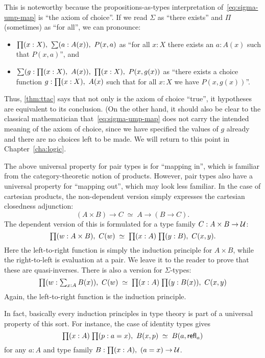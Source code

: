 This is noteworthy because the propositions-as-types interpretation of~\eqref{eq:sigma-ump-map} is ``the axiom of choice''.
If we read $\Sigma$ as ``there exists'' and $\Pi$ (sometimes) as ``for all'', we can pronounce:
\begin{itemize}
\item $\prd{x:X} \sm{a:A(x)} P(x,a)$ as ``for all $x:X$ there exists an $a:A(x)$ such that $P(x,a)$'', and
\item $\sm{g:\prd{x:X} A(x)} \prd{x:X} P(x,g(x))$ as ``there exists a choice function $g:\prd{x:X} A(x)$ such that for all $x:X$ we have $P(x,g(x))$''.
\end{itemize}
Thus, \autoref{thm:ttac} says that not only is the axiom of choice ``true'', it hypotheses are equivalent to its conclusion.
(On the other hand, it should also be clear to the classical mathematician that~\eqref{eq:sigma-ump-map} does not carry the intended meaning of the axiom of choice, since we have specified the values of $g$ already and there are no choices left to be made.
We will return to this point in Chapter~\ref{cha:logic}.

The above universal property for pair types is for ``mapping in'', which is familiar from the category-theoretic notion of products.
However, pair types also have a universal property for ``mapping out'', which may look less familiar.
In the case of cartesian products, the non-dependent version simply expresses the cartesian closedness adjunction:
\[ (A\times B) \to C \;\simeq\; A\to (B\to C).\]
The dependent version of this is formulated for a type family $C:A\times B\to \mathcal{U}$:
\[ \prd{w:A\times B} C(w) \;\simeq\; \prd{x:A}{y:B} C(x,y). \]
Here the left-to-right function is simply the induction principle for $A\times B$, while the right-to-left is evaluation at a pair.
We leave it to the reader to prove that these are quasi-inverses.
There is also a version for $\Sigma$-types:
\begin{equation}
  \prd{w:\textstyle\sum_{x:A} B(x)} C(w) \;\simeq\; \prd{x:A}{y:B(x)} C(x,y)\label{eq:sigma-lump}
\end{equation}
Again, the left-to-right function is the induction principle.

In fact, basically every induction principles in type theory is part of a universal property of this sort.
For instance, the case of identity types gives
\begin{equation}
  \label{eq:path-lump}
  \prd{x:A}{p:a=x} B(x,p) \;\simeq\; B(a,\refl a)
\end{equation}
for any $a:A$ and type family $B:\prd{x:A} (a=x) \to\type$.



